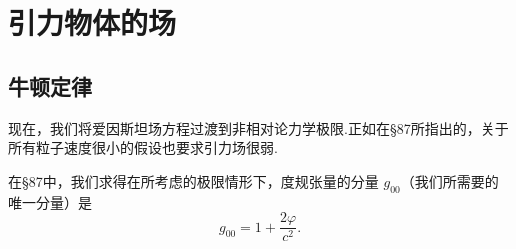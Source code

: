 \chapter{引力物体的场}

\section{牛顿定律}

现在，我们将爱因斯坦场方程过渡到非相对论力学极限.正如在§87所指出的，关于所有粒子速度很小的假设也要求引力场很弱.

在§87中，我们求得在所考虑的极限情形下，度规张量的分量 $g_{00}$（我们所需要的唯一分量）是
\begin{equation*}
  g_{00}=1+\frac{2\varphi}{c^{2}}.
\end{equation*}


